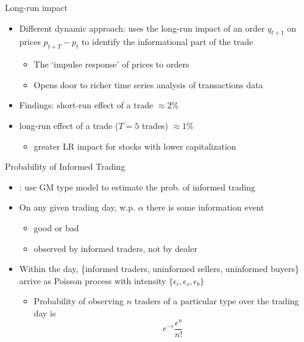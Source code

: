 \documentclass[english,10pt
,aspectratio=169
]{beamer}
\begin{document}
\begin{frame}{Long-run impact}
	\begin{itemize}
		\item Different dynamic approach: \textbf{\cite{hasbrouck_measuring_1991}} uses the long-run impact of an order $q_{t+1}$ on prices $p_{t+T}-p_t$ to identify the informational part of the trade
		\begin{itemize}
			\item The `impulse response' of prices to orders
			\item Opens door to richer time series analysis of transactions data
		\end{itemize}
		\item Findings: short-run effect of a trade $\approx 2\%$
		\item long-run effect of a trade ($T=5$ trades) $\approx 1\%$
		\begin{itemize}
			\item greater LR impact for stocks with lower capitalization
		\end{itemize}
	\end{itemize}
\end{frame}


\begin{frame}{Probability of Informed Trading}
	\begin{itemize}
		\item \textbf{\citet*{easley_liquidity_1996}}: use GM type model to estimate the prob. of informed trading
		\item On any given trading day, w.p. $\alpha$ there is some information event
		\begin{itemize}
			\item good or bad
			\item observed by informed traders, not by dealer
		\end{itemize}
		\item Within the day, \{informed traders, uninformed sellers, uninformed buyers\} arrive as Poisson process with intensity $\{\epsilon_i, \epsilon_s, \epsilon_b \}$
		\begin{itemize}
			\item Probability of observing $n$ traders of a particular type over the trading day is
			\[
			e^{-\epsilon} \frac{\epsilon^n}{n!}
			\]
		\end{itemize}
	\end{itemize}
\end{frame}
\end{document}
